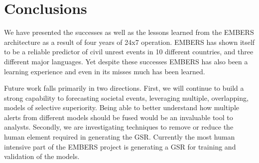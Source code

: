 \section{Conclusions}
We have presented the successes as well as the lessons learned from the EMBERS
architecture as a result of four years of 24x7 operation.  EMBERS has shown
itself to be a reliable predictor of civil unrest events in 10 different
countries, and three different major languages.  Yet despite these successes
EMBERS has also been a learning experience and even in its misses much has been
learned.

Future work falls primarily in two directions.
First, we will continue
to build a strong capability to forecasting societal events,
leveraging multiple, overlapping,
models of selective superiority.
Being able to better understand how multiple
alerts from different models should be fused would 
be an invaluable tool to analysts.
Secondly, we are investigating
techniques to remove or reduce the human element required in generating 
the GSR.  Currently the most human intensive part of the EMBERS project 
is generating a GSR for training and validation of the models.

